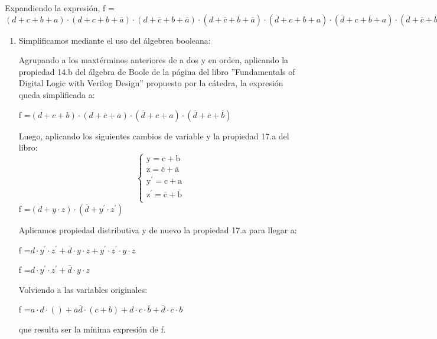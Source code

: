 \documentclass[../../informe/src/main.tex]{subfiles}
\begin{document}
	Expandiendo la expresión, f =$ (d+c+b+a)\cdot (d+c+b+\overline{a})\cdot (d+\overline{c}+b+\overline{a})
	\cdot (d+\overline{c}+\overline{b}+\overline{a})\cdot (\overline{d}+c+b+a)\cdot
	 (\overline{d}+c+\overline{b}+a)\cdot (\overline{d}+\overline{c}+\overline{b}+a)\cdot
	 (\overline{d}+\overline{c}+\overline{b}+\overline{a})$
	 \par
	 \begin{enumerate}
	 	\item Simplificamos mediante el uso del álgebrea booleana: \par
	 	
	 		Agrupando a los maxtérminos anteriores de a dos y en orden, aplicando la propiedad 14.b del álgebra de Boole de la página del 				libro ''Fundamentals of Digital Logic with Verilog Design'' propuesto por la cátedra, la expresión queda simplificada a: \par
	 		f =$ (d+c+b)\cdot (d+\overline{c}+\overline{a})\cdot (\overline{d}+c+a)\cdot (\overline{d}+\overline{c}+\overline{b})$\par
			Luego, aplicando los siguientes cambios de variable y la propiedad 17.a del libro:
	 			\begin{equation}
  		  	\left\{
	  			\begin{array}{ll}
		 					\mathrm{y} = \mathrm{c + b} \\
					 		\mathrm{z} = \mathrm{\overline{c} + \overline{a}} \\
		 					\mathrm{y^{'}} = \mathrm{c + a} \\
					 		\mathrm{z^{'}} = \mathrm{\overline{c} + \overline{b}} \\			 		
	  		  \end{array}
	 		   \right.
 				\end{equation}
 			f =$ (d + y\cdot z)\cdot (\overline{d} + y^{'}\cdot z^{'})$ \par
			Aplicamos propiedad distributiva y de nuevo la propiedad 17.a para llegar a:
			\par
			f =$ d\cdot y^{'}\cdot z^{'} + \overline{d}\cdot y\cdot z + y^{'}\cdot z^{'}\cdot y\cdot z$
			\par
			f =$ d\cdot y^{'}\cdot z^{'} + \overline{d}\cdot y\cdot z$
			\par
			Volviendo a las variables originales: \par
	
			f =$ a\cdot d\cdot ()+ \overline{a}\overline{d}\cdot(c + b) + d\cdot c \cdot \overline{b} + 
			\overline{d}\cdot \overline{c} \cdot b$\par
			que resulta ser la mínima expresión de f. \par


\end{enumerate}
\end{document}
